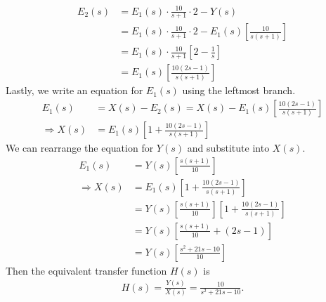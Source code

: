 \documentclass{report}
\begin{document}
\begin{solution}
\begin{align*}
        E_2(s) &= E_1(s) \cdot \frac{10}{s+1} \cdot 2 - Y(s) \\
        &= E_1(s) \cdot \frac{10}{s+1} \cdot 2 - E_1(s) \left[\frac{10}{s(s+1)}\right] \\ 
        &= E_1(s) \cdot \frac{10}{s+1} \left[2-\frac{1}{s}\right] \\
        &= E_1(s) \left[\frac{10(2s-1)}{s(s+1)}\right]
    \end{align*}
    Lastly, we write an equation for $E_1(s)$ using the leftmost branch.
    \begin{align*}
        E_1(s) &= X(s) - E_2(s) = X(s) - E_1(s) \left[\frac{10(2s-1)}{s(s+1)}\right] \\
        \Longrightarrow X(s) &= E_1(s)\left[1 + \frac{10(2s-1)}{s(s+1)}\right]
    \end{align*}
    We can rearrange the equation for $Y(s)$ and substitute into $X(s)$.
    \begin{align*}
        E_1(s) &= Y(s)\left[\frac{s(s+1)}{10}\right] \\
        \Longrightarrow X(s) &= E_1(s)\left[1 + \frac{10(2s-1)}{s(s+1)}\right] \\
        &= Y(s)\left[\frac{s(s+1)}{10}\right]\left[1 + \frac{10(2s-1)}{s(s+1)}\right] \\
        &= Y(s)\left[\frac{s(s+1)}{10} + (2s-1)\right] \\
        &= Y(s)\left[\frac{s^2+21s-10}{10}\right]
    \end{align*}
    Then the equivalent transfer function $H(s)$ is  
    \begin{align*}
        H(s) = \frac{Y(s)}{X(s)} = \frac{10}{s^2+21s-10}.
    \end{align*}
\end{solution}
\end{document}

